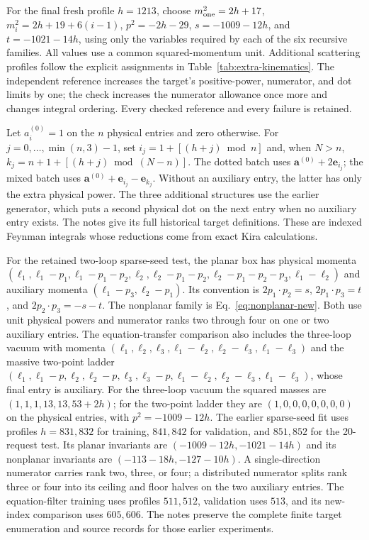 For the final fresh profile $h=1213$, choose $m_{\rm one}^2=2h+17$, $m_i^2=2h+19+6(i-1)$, $p^2=-2h-29$, $s=-1009-12h$, and $t=-1021-14h$, using only the variables required by each of the six recursive families. All values use a common squared-momentum unit. Additional scattering profiles follow the explicit assignments in Table~\ref{tab:extra-kinematics}. The independent reference increases the target's positive-power, numerator, and dot limits by one; the check increases the numerator allowance once more and changes integral ordering. Every checked reference and every failure is retained.


Let $a_i^{(0)}=1$ on the $n$ physical entries and zero otherwise. For $j=0,\ldots,\min(n,3)-1$, set $i_j=1+[(h+j)\bmod n]$ and, when $N>n$, $k_j=n+1+[(h+j)\bmod(N-n)]$. The dotted batch uses $\boldsymbol a^{(0)}+2\boldsymbol e_{i_j}$; the mixed batch uses $\boldsymbol a^{(0)}+\boldsymbol e_{i_j}-\boldsymbol e_{k_j}$. Without an auxiliary entry, the latter has only the extra physical power. The three additional structures use the earlier generator, which puts a second physical dot on the next entry when no auxiliary entry exists. The notes give its full historical target definitions. These are indexed Feynman integrals whose reductions come from exact Kira calculations.

For the retained two-loop sparse-seed test, the planar box has physical momenta $(\ell_1,\ell_1-p_1,\ell_1-p_1-p_2,\ell_2,\ell_2-p_1-p_2,\ell_2-p_1-p_2-p_3,\ell_1-\ell_2)$ and auxiliary momenta $(\ell_1-p_3,\ell_2-p_1)$. Its convention is $2p_1\cdot p_2=s$, $2p_1\cdot p_3=t$, and $2p_2\cdot p_3=-s-t$. The nonplanar family is Eq.~\eqref{eq:nonplanar-new}. Both use unit physical powers and numerator ranks two through four on one or two auxiliary entries. The equation-transfer comparison also includes the three-loop vacuum with momenta $(\ell_1,\ell_2,\ell_3,\ell_1-\ell_2,\ell_2-\ell_3,\ell_1-\ell_3)$ and the massive two-point ladder $(\ell_1,\ell_1-p,\ell_2,\ell_2-p,\ell_3,\ell_3-p,\ell_1-\ell_2,\ell_2-\ell_3,\ell_1-\ell_3)$, whose final entry is auxiliary. For the three-loop vacuum the squared masses are $(1,1,1,13,13,53+2h)$; for the two-point ladder they are $(1,0,0,0,0,0,0,0)$ on the physical entries, with $p^2=-1009-12h$. The earlier sparse-seed fit uses profiles $h=831,832$ for training, $841,842$ for validation, and $851,852$ for the 20-request test. Its planar invariants are $(-1009-12h,-1021-14h)$ and its nonplanar invariants are $(-113-18h,-127-10h)$. A single-direction numerator carries rank two, three, or four; a distributed numerator splits rank three or four into its ceiling and floor halves on the two auxiliary entries. The equation-filter training uses profiles $511,512$, validation uses $513$, and its new-index comparison uses $605,606$. The notes preserve the complete finite target enumeration and source records for those earlier experiments.

